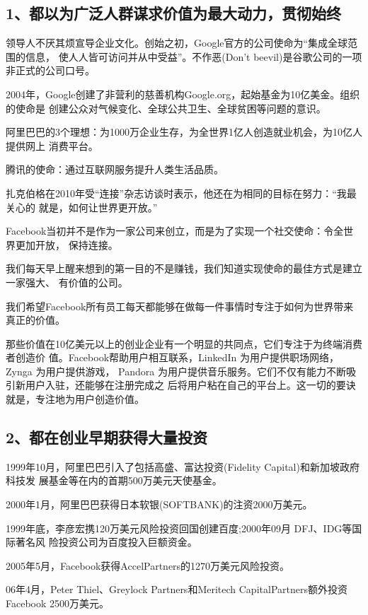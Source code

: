\documentclass[11pt]{ctexart}
\begin{document}
{{{{\subsection{1、都以为广泛人群谋求价值为最大动力，贯彻始终}
\label{sec:orgdfa17bc}

领导人不厌其烦宣导企业文化。创始之初，Google官方的公司使命为“集成全球范围的信息，
使人人皆可访问并从中受益”。不作恶(Don't beevil)是谷歌公司的一项非正式的公司口号。

2004年，Google创建了非营利的慈善机构Google.org，起始基金为10亿美金。组织的使命是
创建公众对气候变化、全球公共卫生、全球贫困等问题的意识。

阿里巴巴的3个理想：为1000万企业生存，为全世界1亿人创造就业机会，为10亿人提供网上
消费平台。

腾讯的使命：通过互联网服务提升人类生活品质。

扎克伯格在2010年受“连接”杂志访谈时表示，他还在为相同的目标在努力：“我最关心的
就是，如何让世界更开放。”

Facebook当初并不是作为一家公司来创立，而是为了实现一个社交使命：令全世界更加开放，
保持连接。

我们每天早上醒来想到的第一目的不是赚钱，我们知道实现使命的最佳方式是建立一家强大、
有价值的公司。

我们希望Facebook所有员工每天都能够在做每一件事情时专注于如何为世界带来真正的价值。

那些价值在10亿美元以上的创业企业有一个明显的共同点，它们专注于为终端消费者创造价
值。Facebook帮助用户相互联系，LinkedIn 为用户提供职场网络，Zynga 为用户提供游戏，
Pandora 为用户提供音乐服务。它们不仅有能力不断吸引新用户入驻，还能够在注册完成之
后将用户粘在自己的平台上。这一切的要诀就是，专注地为用户创造价值。

\subsection{2、都在创业早期获得大量投资}
\label{sec:org46def19}

1999年10月，阿里巴巴引入了包括高盛、富达投资(Fidelity Capital)和新加坡政府科技发
展基金等在内的首期500万美元天使基金。

2000年1月，阿里巴巴获得日本软银(SOFTBANK)的注资2000万美元。

1999年底，李彦宏携120万美元风险投资回国创建百度;2000年09月 DFJ、IDG等国际著名风
险投资公司为百度投入巨额资金。

2005年5月，Facebook获得AccelPartners的1270万美元风险投资。

06年4月，Peter Thiel、Greylock Partners和Meritech CapitalPartners额外投资
Facebook 2500万美元。

}}}}
\end{document}
